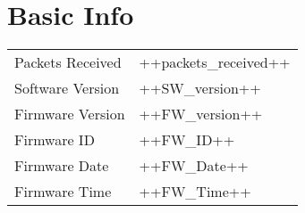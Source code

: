 
\section{Basic Info}

\begin{tabular}{p{5cm}p{5cm}}
    Packets Received              & ++packets_received++                                         \\
    Software Version              & ++SW_version++                                               \\
    Firmware Version              & ++FW_version++                                               \\
    Firmware ID                   & ++FW_ID++                                                    \\
    Firmware Date                 & ++FW_Date++                                                  \\
    Firmware Time                 & ++FW_Time++                                                  \\
\end{tabular}


